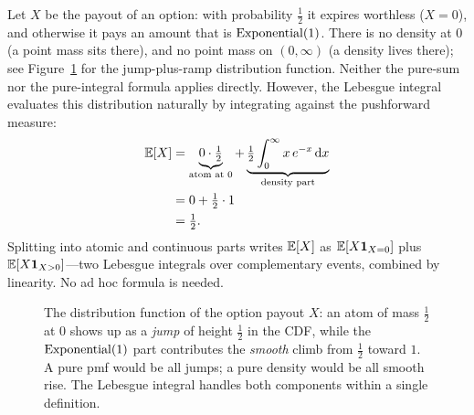 \begin{example}
\label{ch37:mixed}
Let $X$ be the payout of an option: with probability $\tfrac12$ it expires
worthless ($X=0$), and otherwise it pays an amount that is $\operatorname{Exponential}(1)$. There is
no density at $0$ (a point mass sits there), and no point mass on $(0,\infty)$
(a density lives there); see Figure~\ref{ch37:fig-mixed-cdf} for the jump-plus-ramp
distribution function. Neither the pure-sum nor the pure-integral formula applies
directly. However, the Lebesgue integral evaluates this distribution naturally
by integrating against the pushforward measure:
\begin{align*}
  \operatorname{\mathbb{E}}[X] &= \underbrace{0\cdot \tfrac12}_{\text{atom at }0}
        + \underbrace{\tfrac12\int_0^\infty x\,e^{-x}\,\mathrm{d} x}_{\text{density part}} \\
        &= 0 + \tfrac12\cdot 1 \\
        &= \tfrac12 .
\end{align*}
Splitting into atomic and continuous parts writes $\operatorname{\mathbb{E}}[X]$ as $\operatorname{\mathbb{E}}[X\mathbf{1}_{X=0}]$ plus
$\operatorname{\mathbb{E}}[X\mathbf{1}_{X>0}]$---two Lebesgue integrals over complementary events, combined by
linearity. No ad hoc formula is needed.
\end{example}

\begin{figure}[H]
\centering
{}
\caption{The distribution function of the option payout $X$: an atom of mass
$\tfrac12$ at $0$ shows up as a \emph{jump} of height $\tfrac12$ in the CDF,
while the $\operatorname{Exponential}(1)$ part contributes the \emph{smooth} climb from $\tfrac12$
toward $1$. A pure pmf would be all jumps; a pure density would be all smooth
rise. The Lebesgue integral handles both components within a single definition.}
\label{ch37:fig-mixed-cdf}
\end{figure}

